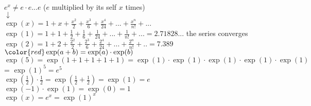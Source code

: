 \documentclass[a4paper,12pt,openany,oneside]{article}
\begin{document}
\\[0.2cm]
$e^x \neq e\cdot e...e$ ($e$ multiplied by its self $x$ times)
\\
$\downarrow$
\\
$\exp(x) = 1+x+\frac{x^2}{2}+\frac{x^3}{6}+\frac{x^4}{24}+...+\frac{x^n}{n!}+...$
\\[0.1cm]
$\exp(1) = 1+1+\frac{1}{2}+\frac{1}{6}+\frac{1}{24}+...+\frac{1}{n!}+...=2.71828...$ the series converges
\\[0.1cm]
$\exp(2) = 1+2+\frac{2^2}{2}+\frac{2^3}{6}+\frac{2^4}{24}+...+\frac{2^n}{n!}+..=7.389$
\\[0.3cm]
$\color{red}\exp(a+b) = \exp(a)\cdot \exp(b)$
\\[0.1cm]
$\exp(5) = \exp(1+1+1+1+1) = \exp(1)\cdot \exp(1)\cdot \exp(1) \cdot \exp(1) \cdot \exp(1)$ = $\exp(1)^5=e^5$
\\[0.1cm]
$\exp(\frac{1}{2})\cdot \frac{1}{2} = \exp(\frac{1}{2}+\frac{1}{2})=\exp(1)=e$
\\[0.1cm]
$\exp(-1)\cdot\exp(1)=\exp(0)=1$
\\[0.1cm]
$\exp(x)=e^x=\exp(1)^x$
\end{document}
